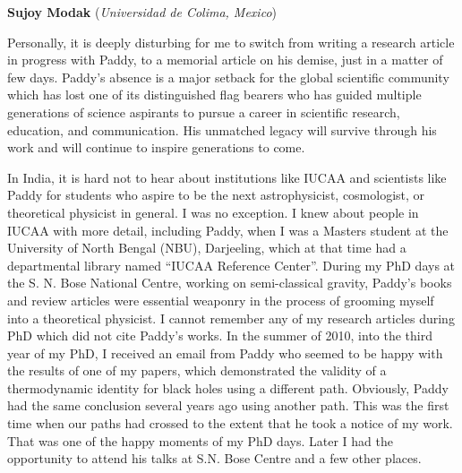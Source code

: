 \documentclass[prd, preprint, longbibliography, 12pt]{revtex4-2}
\begin{document}
\bigskip

\bigskip

\centerline{{\bf Sujoy Modak} ({\it Universidad de Colima, Mexico})}
\medskip
{}

\noindent Personally, it is deeply disturbing for me to switch from writing a research article in progress with Paddy, to a memorial article on his demise, just in a matter of few days. Paddy’s absence is a major setback for the global scientific community which has lost one of its distinguished flag bearers who has guided multiple generations of science aspirants to pursue a career in scientific research, education, and communication. His unmatched legacy will survive through his work and will continue to inspire generations to come.

In India, it is hard not to hear about  institutions like IUCAA and scientists like Paddy for students who aspire to be the next astrophysicist, cosmologist, or theoretical physicist in general. I was no exception. I knew about people in IUCAA with more detail, including Paddy, when I was a Masters student at the University of North Bengal (NBU), Darjeeling, which at that time had a departmental library named “IUCAA Reference Center”. During my PhD days at the S. N. Bose National Centre, working on semi-classical gravity, Paddy’s books and review articles were essential weaponry in the process of grooming myself into a theoretical physicist. I cannot remember any of my research articles during PhD which did not cite Paddy’s works. In the summer of 2010, into the third year of my PhD, I received an email from Paddy who seemed to be happy with the results of one of my papers, which demonstrated the validity of a thermodynamic identity for black holes using a different path. Obviously, Paddy had the same conclusion several years ago using another path. This was the first time when our paths had crossed to the extent that he took a notice of my work. That was one of the happy moments of my PhD days. Later I had the opportunity to attend his talks at S.N. Bose Centre and a few other places.
\end{document}
